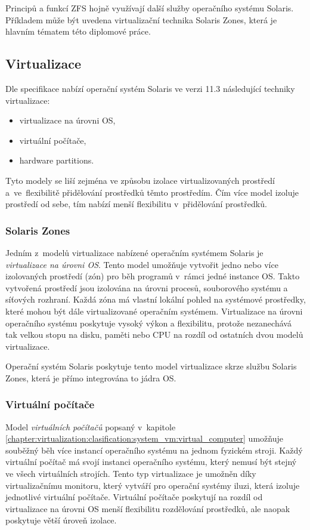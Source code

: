 Principů a funkcí ZFS hojně využívají další služby operačního systému Solaris. Příkladem může být uvedena virtualizační technika
Solaris Zones, která je hlavním tématem této diplomové práce.
\subsection{Virtualizace}
\label{chapter:solaris:virtualization}
Dle specifikace \cite{oracle:solaris:virtualization} nabízí operační systém Solaris ve verzi 11.3 následující techniky virtualizace:
\begin{itemize}
 \item virtualizace na úrovni OS,
 \item virtuální počítače,
 \item hardware partitions.
\end{itemize}
Tyto modely se liší zejména ve způsobu izolace virtualizovaných prostředí a~ve~flexibilitě přidělování prostředků těmto
prostředím. Čím více model izoluje prostředí od sebe, tím nabízí menší flexibilitu v~přidělování prostředků.
\subsubsection{Solaris Zones}
\label{chapter:solaris:virtualization:szones}
Jedním z~modelů virtualizace nabízené operačním systémem Solaris je \textit{virtualizace na úrovni OS}. Tento model umožňuje
vytvořit jedno nebo více izolovaných prostředí (zón) pro běh programů v~rámci jedné instance OS. Takto vytvořená prostředí
jsou izolována na úrovni procesů, souborového systému a síťových rozhraní. Každá zóna má vlastní lokální pohled na systémové
prostředky, které mohou být dále virtualizované operačním systémem. Virtualizace na úrovni operačního systému poskytuje vysoký
výkon a flexibilitu, protože nezanechává tak velkou stopu na disku, paměti nebo CPU na rozdíl od ostatních dvou modelů virtualizace. 

Operační systém Solaris poskytuje tento model virtualizace skrze službu Solaris Zones, která je přímo integrována to jádra OS.
\subsubsection{Virtuální počítače}
\label{chapter:solaris:virtualization:vm}
Model \textit{virtuálních počítačů} popsaný v~kapitole \ref{chapter:virtualization:clasification:system_vm:virtual_computer} 
umožňuje souběžný běh více instancí operačního systému na jednom fyzickém stroji. Každý virtuální počítač má svojí instanci
operačního systému, který nemusí být stejný ve všech virtuálních strojích. Tento typ virtualizace je umožněn díky virtualizačnímu
monitoru, který vytváří pro operační systémy iluzi, která izoluje jednotlivé virtuální počítače. Virtuální počítače poskytují na rozdíl od
virtualizace na úrovni OS menší flexibilitu rozdělování prostředků, ale naopak poskytuje větší úroveň izolace.

